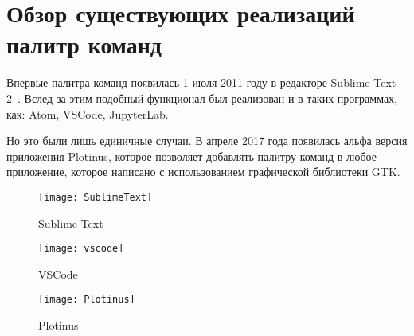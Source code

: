 \chapter{Обзор существующих реализаций палитр команд}

Впервые палитра команд появилась 1 июля 2011 году в редакторе Sublime Text
2~\cite{sublimetext2changelog}. Вслед за этим подобный функционал был реализован
и в таких программах, как:
Atom\cite{atom},
VSCode\cite{vscode},
JupyterLab\cite{jupyterlab}.

Но это были лишь единичные случаи. В апреле 2017 года появилась альфа версия
приложения Plotinus\cite{plotinus}, которое позволяет добавлять палитру команд в
любое приложение, которое написано с использованием графической библиотеки GTK.

\begin{figure}
	\texttt{[image: SublimeText]}
	\caption{Sublime Text}
\end{figure}

\begin{figure}
	\texttt{[image: vscode]}
	\caption{VSCode}
\end{figure}

\begin{figure}
	\texttt{[image: Plotinus]}
	\caption{Plotinus}
\end{figure}

